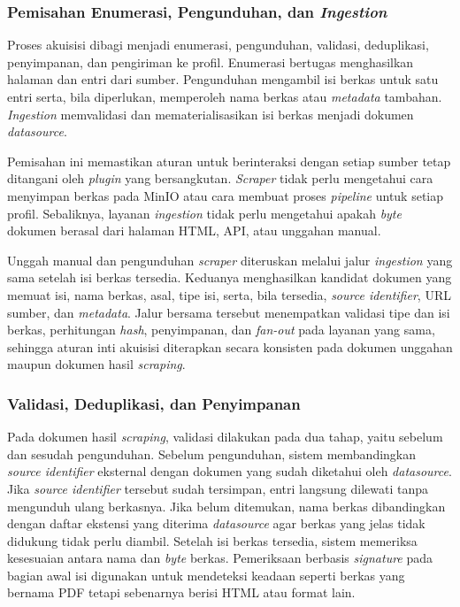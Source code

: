 \subsubsection{Pemisahan Enumerasi, Pengunduhan, dan \textit{Ingestion}}
\label{sec:solusi-pemisahan-akuisisi}

Proses akuisisi dibagi menjadi enumerasi, pengunduhan, validasi, deduplikasi, penyimpanan, dan pengiriman ke profil.
Enumerasi bertugas menghasilkan halaman dan entri dari sumber.
Pengunduhan mengambil isi berkas untuk satu entri serta, bila diperlukan, memperoleh nama berkas atau \textit{metadata} tambahan.
\textit{Ingestion} memvalidasi dan mematerialisasikan isi berkas menjadi dokumen \textit{datasource}.

Pemisahan ini memastikan aturan untuk berinteraksi dengan setiap sumber tetap ditangani oleh \textit{plugin} yang bersangkutan.
\textit{Scraper} tidak perlu mengetahui cara menyimpan berkas pada MinIO atau cara membuat proses \textit{pipeline} untuk setiap profil.
Sebaliknya, layanan \textit{ingestion} tidak perlu mengetahui apakah \textit{byte} dokumen berasal dari halaman HTML, API, atau unggahan manual.

Unggah manual dan pengunduhan \textit{scraper} diteruskan melalui jalur \textit{ingestion} yang sama setelah isi berkas tersedia.
Keduanya menghasilkan kandidat dokumen yang memuat isi, nama berkas, asal, tipe isi, serta, bila tersedia, \textit{source identifier}, URL sumber, dan \textit{metadata}.
Jalur bersama tersebut menempatkan validasi tipe dan isi berkas, perhitungan \textit{hash}, penyimpanan, dan \textit{fan-out} pada layanan yang sama, sehingga aturan inti akuisisi diterapkan secara konsisten pada dokumen unggahan maupun dokumen hasil \textit{scraping}.

\subsubsection{Validasi, Deduplikasi, dan Penyimpanan}
\label{sec:solusi-validasi-deduplikasi}

Pada dokumen hasil \textit{scraping}, validasi dilakukan pada dua tahap, yaitu sebelum dan sesudah pengunduhan.
Sebelum pengunduhan, sistem membandingkan \textit{source identifier} eksternal dengan dokumen yang sudah diketahui oleh \textit{datasource}.
Jika \textit{source identifier} tersebut sudah tersimpan, entri langsung dilewati tanpa mengunduh ulang berkasnya.
Jika belum ditemukan, nama berkas dibandingkan dengan daftar ekstensi yang diterima \textit{datasource} agar berkas yang jelas tidak didukung tidak perlu diambil.
Setelah isi berkas tersedia, sistem memeriksa kesesuaian antara nama dan \textit{byte} berkas.
Pemeriksaan berbasis \textit{signature} pada bagian awal isi digunakan untuk mendeteksi keadaan seperti berkas yang bernama PDF tetapi sebenarnya berisi HTML atau format lain.

